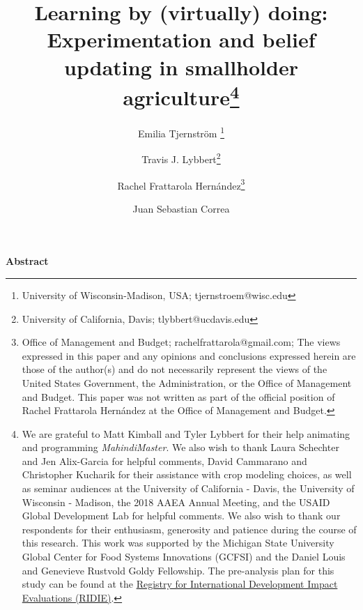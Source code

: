 \documentclass[12pt,letterpaper]{article}
\begin{document}
\author{Emilia Tjernstr\"om \thanks{University of Wisconsin-Madison, USA; tjernstroem@wisc.edu}
\and
Travis J. Lybbert\thanks{University of California, Davis; tlybbert@ucdavis.edu}
\and 
Rachel Frattarola Hern\'andez\thanks{Office of Management and Budget; rachelfrattarola@gmail.com; The views expressed in this paper and any opinions and conclusions expressed herein are those of the author(s) and do not necessarily represent the views of the United States Government, the Administration, or the Office of Management and Budget. This paper was not written as part of the official position of Rachel Frattarola Hern\'andez at the Office of Management and Budget.}
\and 
Juan Sebastian Correa\footnotemark[3]}


\title{Learning by (virtually) doing: Experimentation and belief updating in smallholder agriculture\thanks{We are grateful to Matt Kimball and Tyler Lybbert for their help animating and programming \textit{MahindiMaster}. We also wish to thank Laura Schechter and Jen Alix-Garcia for helpful comments, David Cammarano and Christopher Kucharik for their assistance with crop modeling choices, as well as seminar audiences at the University of California - Davis, the University of Wisconsin - Madison, the 2018 AAEA Annual Meeting, and the USAID Global Development Lab for helpful comments. We also wish to thank our respondents for their enthusiasm, generosity and patience during the course of this research. This work was supported by the Michigan State University Global Center for Food Systems Innovations (GCFSI) and the Daniel Louis and Genevieve Rustvold Goldy Fellowship.  The pre-analysis plan for this study can be found at the \href{http://ridie.org/index.php?r=search/detailView&id=528}{Registry for International Development Impact Evaluations (RIDIE)}.}}

\maketitle
\thispagestyle{empty}

{
\centering
\textbf{Abstract}
}
\end{document}
